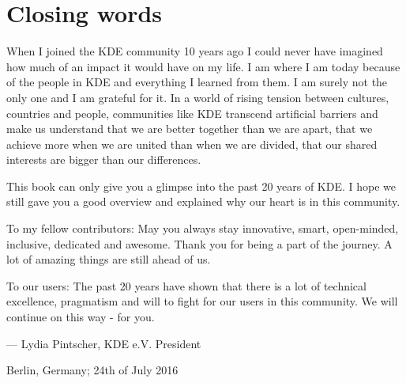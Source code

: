 \chapter*{Closing words}

When I joined the KDE community 10 years ago I could never have imagined how much of an impact it would have on my life. I am where I am today because of the people in KDE and everything I learned from them. I am surely not the only one and I am grateful for it. In a world of rising tension between cultures, countries and people, communities like KDE transcend artificial barriers and make us understand that we are better together than we are apart, that we achieve more when we are united than when we are divided, that our shared interests are bigger than our differences.

This book can only give you a glimpse into the past 20 years of KDE. I hope we still gave you a good overview and explained why our heart is in this community.

To my fellow contributors: May you always stay innovative, smart, open-minded, inclusive, dedicated and awesome. Thank you for being a part of the journey. A lot of amazing things are still ahead of us.

To our users: The past 20 years have shown that there is a lot of technical excellence, pragmatism and will to fight for our users in this community. We will continue on this way - for you.

\begin{flushright}--- Lydia Pintscher, KDE e.V. President\end{flushright}
\begin{flushright}Berlin, Germany; 24th of July 2016\end{flushright}
